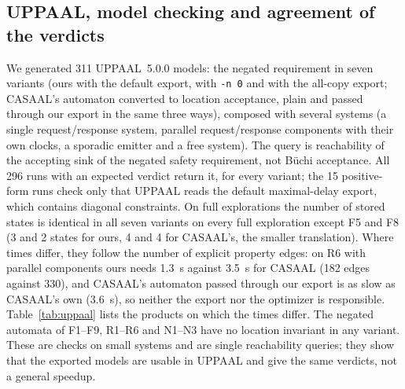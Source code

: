 \subsection{UPPAAL, model checking and agreement of the verdicts}
\label{sec:uppaal-check}
\begin{table}[tp]
\centering
\caption{UPPAAL~5.0.0, breadth-first search with default extrapolation, on the negated requirement composed with a system, for selected products (par-ok: parallel request/response components that always answer; free: the free system). Of the seven variants, the table shows ours with the default export, ours with the all-copy export, CASAAL converted to location acceptance, and CASAAL converted and passed through our export; the other three are the same automata with the optimizer disabled. Stored states are identical in all seven variants on these products (and on all full explorations except F5 and F8, where ours stores 3 and 2 states against 4 and 4 for CASAAL); times are medians of three runs including process start; the last column gives the number of explicit property transitions of ours and of CASAAL's automaton.}
\label{tab:uppaal}
\small

\end{table}
We generated 311 UPPAAL~5.0.0 models: the negated requirement in seven variants (ours with the default export, with \texttt{-n 0} and with the all-copy export; CASAAL's automaton converted to location acceptance, plain and passed through our export in the same three ways), composed with several systems (a single request/response system, parallel request/response components with their own clocks, a sporadic emitter and a free system). The query is reachability of the accepting sink of the negated safety requirement, not B\"uchi acceptance. All 296 runs with an expected verdict return it, for every variant; the 15 positive-form runs check only that UPPAAL reads the default maximal-delay export, which contains diagonal constraints.
On full explorations the number of stored states is identical in all seven variants on every full exploration except F5 and F8 (3 and 2 states for ours, 4 and 4 for CASAAL's, the smaller translation). Where times differ, they follow the number of explicit property edges: on R6 with parallel components ours needs 1.3~s against 3.5~s for CASAAL (182 edges against 330), and CASAAL's automaton passed through our export is as slow as CASAAL's own (3.6~s), so neither the export nor the optimizer is responsible. Table~\ref{tab:uppaal} lists the products on which the times differ. The negated automata of F1--F9, R1--R6 and N1--N3 have no location invariant in any variant. These are checks on small systems and are single reachability queries; they show that the exported models are usable in UPPAAL and give the same verdicts, not a general speedup.

